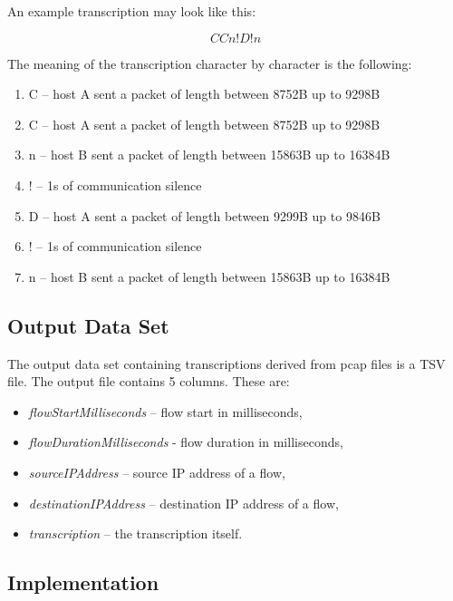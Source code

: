 \documentclass{article}
\begin{document}
\noindent An example transcription may look like this:

$$ CCn!D!n $$

\noindent The meaning of the transcription character by character is the following:

\begin{enumerate}
    \item C -- host A sent a packet of length between 8752B up to 9298B
    \item C -- host A sent a packet of length between 8752B up to 9298B
    \item n -- host B sent a packet of length between 15863B up to 16384B
    \item ! -- 1s of communication silence
    \item D -- host A sent a packet of length between 9299B up to 9846B
    \item ! -- 1s of communication silence
    \item n -- host B sent a packet of length between 15863B up to 16384B
\end{enumerate}


\subsection{Output Data Set}\label{sec-output-dataset}

The output data set containing transcriptions derived from pcap files is a TSV file. The output file contains 5 columns. These are:
\begin{itemize}
    \item \textit{flowStartMilliseconds} -- flow start in milliseconds,
    \item \textit{flowDurationMilliseconds} - flow duration in milliseconds,
    \item \textit{sourceIPAddress} -- source IP address of a flow,
    \item \textit{destinationIPAddress} -- destination IP address of a flow,
    \item \textit{transcription} -- the transcription itself.
\end{itemize}





\subsection{Implementation}
\end{document}

